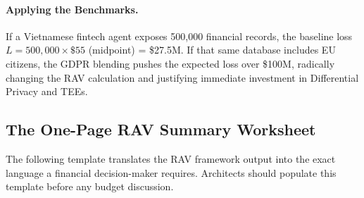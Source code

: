 \paragraph{Applying the Benchmarks.}
If a Vietnamese fintech agent exposes 500,000 financial records, the baseline loss $L = 500,000 \times \$55$ (midpoint) = \$27.5M. If that same database includes EU citizens, the GDPR blending pushes the expected loss over \$100M, radically changing the RAV calculation and justifying immediate investment in Differential Privacy and TEEs.

\subsection{The One-Page RAV Summary Worksheet}
\label{subsec:rav-worksheet}

The following template translates the RAV framework output into the exact language a financial decision-maker requires. Architects should populate this template before any budget discussion.

